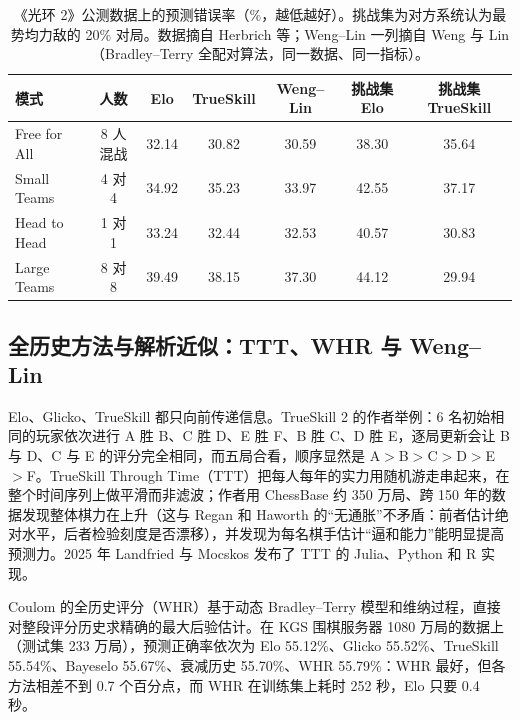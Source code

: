 \begin{table}[htbp]
  \centering\small
  \caption{《光环 2》公测数据上的预测错误率（\%，越低越好）。挑战集为对方系统认为最势均力敌的 20\% 对局。数据摘自 Herbrich 等\cite{herbrich2006trueskill}；Weng–Lin 一列摘自 Weng 与 Lin\cite{weng2011bayesian}（Bradley–Terry 全配对算法，同一数据、同一指标）。}
  \label{tab:1a-halo2}
  \begin{tabular}{lcccccc}
    \toprule
    模式 & 人数 & Elo & TrueSkill & Weng–Lin & 挑战集 Elo & 挑战集 TrueSkill\\
    \midrule
    Free for All & 8 人混战 & 32.14 & 30.82 & 30.59 & 38.30 & 35.64\\
    Small Teams & 4 对 4 & 34.92 & 35.23 & 33.97 & 42.55 & 37.17\\
    Head to Head & 1 对 1 & 33.24 & 32.44 & 32.53 & 40.57 & 30.83\\
    Large Teams & 8 对 8 & 39.49 & 38.15 & 37.30 & 44.12 & 29.94\\
    \bottomrule
  \end{tabular}
\end{table}

\subsection{全历史方法与解析近似：TTT、WHR 与 Weng–Lin}\label{sec:1a-smoothing}

Elo、Glicko、TrueSkill 都只向前传递信息。TrueSkill 2 的作者举例：6 名初始相同的玩家依次进行 A 胜 B、C 胜 D、E 胜 F、B 胜 C、D 胜 E，逐局更新会让 B 与 D、C 与 E 的评分完全相同，而五局合看，顺序显然是 A$>$B$>$C$>$D$>$E$>$F\cite{minka2018trueskill}\tagLit。TrueSkill Through Time（TTT）把每人每年的实力用随机游走串起来，在整个时间序列上做平滑而非滤波；作者用 ChessBase 约 350 万局、跨 150 年的数据发现整体棋力在上升（这与 Regan 和 Haworth 的“无通胀”不矛盾：前者估计绝对水平，后者检验刻度是否漂移），并发现为每名棋手估计“逼和能力”能明显提高预测力\cite{dangauthier2007trueskill}\tagLit。2025 年 Landfried 与 Mocskos 发布了 TTT 的 Julia、Python 和 R 实现\cite{landfried2025trueskill}\tagLit。

Coulom 的全历史评分（WHR）基于动态 Bradley–Terry 模型和维纳过程，直接对整段评分历史求精确的最大后验估计\cite{coulom2008whole}\tagLit。在 KGS 围棋服务器 1080 万局的数据上（测试集 233 万局），预测正确率依次为 Elo 55.12\%、Glicko 55.52\%、TrueSkill 55.54\%、Bayeselo 55.67\%、衰减历史 55.70\%、WHR 55.79\%：WHR 最好，但各方法相差不到 0.7 个百分点，而 WHR 在训练集上耗时 252 秒，Elo 只要 0.4 秒。

